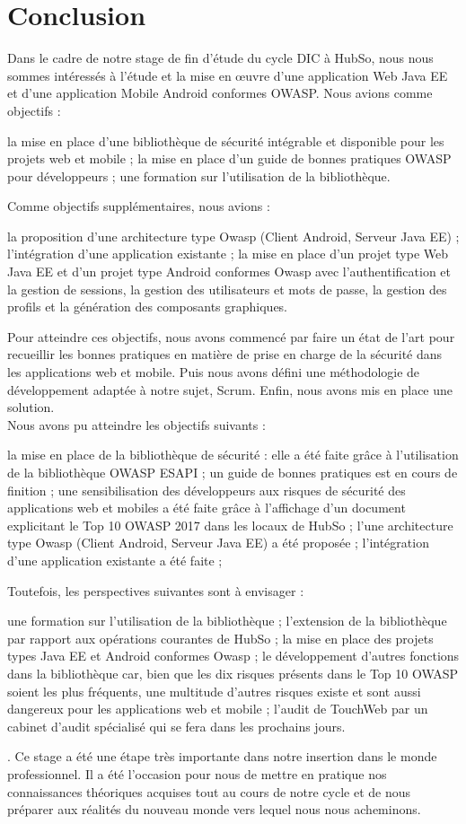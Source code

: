 \chapter*{Conclusion}
Dans le cadre de notre stage de fin d’étude du cycle DIC à HubSo, nous nous sommes intéressés à l'étude et la mise en œuvre d'une application Web Java EE et d'une application Mobile Android conformes OWASP. Nous avions comme objectifs : 
\begin{itemize}
	\itemtirait la mise en place d'une bibliothèque de sécurité intégrable et disponible pour les projets web et mobile ;
	\itemtirait la mise en place d'un guide de bonnes pratiques OWASP pour développeurs ;
	\itemtirait une formation sur l'utilisation de la bibliothèque.
\end{itemize}
Comme objectifs supplémentaires, nous avions :
\begin{itemize}
	\itemtirait la proposition d'une architecture type Owasp (Client Android, Serveur Java EE) ;
	\itemtirait l'intégration d'une application existante ;
	\itemtirait la mise en place d'un projet type Web Java EE et d'un projet type Android conformes Owasp avec l'authentification et la gestion de sessions, la gestion des utilisateurs et mots de passe, la gestion des profils et la génération des composants graphiques.
\end{itemize}
Pour atteindre ces objectifs, nous avons commencé par faire un état de l’art pour recueillir les bonnes pratiques en matière de prise en charge de la sécurité dans les applications web et mobile. Puis nous avons défini une méthodologie de développement adaptée à notre sujet, Scrum. Enfin, nous avons mis en place une solution. \\
Nous avons pu atteindre les objectifs suivants :
\begin{itemize}
	\itemcheck la mise en place de la bibliothèque de sécurité : elle a été faite grâce à l'utilisation de la bibliothèque OWASP ESAPI ;
	\itemcheck un guide de bonnes pratiques est en cours de finition ;
	\itemcheck une sensibilisation des développeurs aux risques de sécurité des applications web et mobiles a été faite grâce à l'affichage d'un document explicitant le Top 10 OWASP 2017 dans les locaux de HubSo ;
	\itemcheck l'une architecture type Owasp (Client Android, Serveur Java EE) a été proposée ;
	\itemcheck l'intégration d'une application existante a été faite ;
\end{itemize}
Toutefois, les perspectives suivantes sont à envisager :
\begin{itemize}
	\itemtirait une formation sur l'utilisation de la bibliothèque ;
	\itemtirait l'extension de la bibliothèque par rapport aux opérations courantes de HubSo ;
	\itemtirait la mise en place des projets types Java EE et Android conformes Owasp ;
	\itemtirait le développement d'autres fonctions dans la bibliothèque car, bien que les dix risques présents dans le Top 10 OWASP soient les plus fréquents, une multitude d'autres risques existe et sont aussi dangereux pour les applications web et mobile ;
	\itemtirait l'audit de TouchWeb par un cabinet d'audit spécialisé qui se fera dans les prochains jours.
\end{itemize}.
Ce stage a été une étape très importante dans notre insertion dans le monde professionnel. Il a été l’occasion pour nous de mettre en pratique nos connaissances théoriques acquises tout au cours de notre cycle et de nous préparer aux réalités du nouveau monde vers lequel nous nous acheminons.